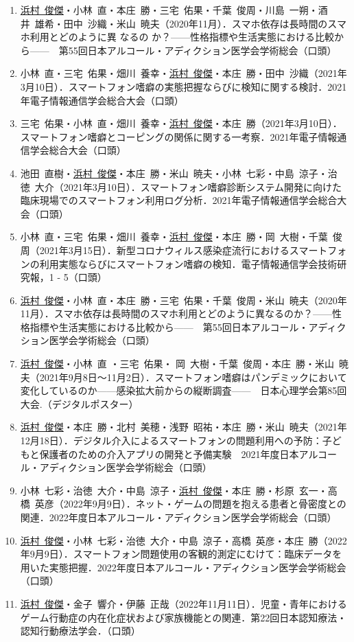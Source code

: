\documentclass{article}
\begin{document}
\begin{enumerate}
	\item \underline{浜村\ 俊傑}・小林\ 直・本庄\ 勝・三宅\ 佑果・千葉\ 俊周・川島\ 一朔・酒井\ 雄希・田中\ 沙織・米山\ 暁夫（2020年11月）．スマホ依存は長時間のスマホ利用とどのように異	なるの	か？——性格指標や生活実態における比較から——　第55回日本アルコール・アディクション医学会学術総会（口頭）
	\item 小林\ 直・三宅\ 佑果・畑川\ 養幸・\underline{浜村\ 俊傑}・本庄\ 勝・田中\ 沙織（2021年3月10日）．スマートフォン嗜癖の実態把握ならびに検知に関する検討．2021年電子情報通信学会総合大会（口頭）
	\item 三宅\ 佑果・小林\ 直・畑川\ 養幸・\underline{浜村\ 俊傑}・本庄\ 勝（2021年3月10日）．スマートフォン嗜癖とコーピングの関係に関する一考察．2021年電子情報通信学会総合大会（口頭）
	\item 池田\ 直樹・\underline{浜村\ 俊傑}・本庄\ 勝・米山\ 暁夫・小林\ 七彩・中島\ 涼子・治徳\ 大介（2021年3月10日）．スマートフォン嗜癖診断システム開発に向けた臨床現場でのスマートフォン利用ログ分析．2021年電子情報通信学会総合大会（口頭）
	\item 小林\ 直・三宅\ 佑果・畑川\ 養幸・\underline{浜村\ 俊傑}・本庄\ 勝・岡\ 大樹・千葉\ 俊周（2021年3月15日）．新型コロナウィルス感染症流行におけるスマートフォンの利用実態ならびにスマートフォン嗜癖の検知．電子情報通信学会技術研究報，1 - 5（口頭）
	\item \underline{浜村\ 俊傑}・小林\ 直・本庄\ 勝・三宅\ 佑果・千葉\ 俊周・米山\ 暁夫（2020年11月）．スマホ依存は長時間のスマホ利用とどのように異なるのか？——性格指標や生活実態における比較から——　第55回日本アルコール・アディクション医学会学術総会（口頭）
	\item \underline{浜村\ 俊傑}・小林\ 直 ・三宅\ 佑果・ 岡\ 大樹・千葉\ 俊周・本庄\ 勝・米山\ 暁夫（2021年9月8日～11月2日）．スマートフォン嗜癖はパンデミックにおいて変化しているのか——感染拡大前からの縦断調査——　日本心理学会第85回大会.（デジタルポスター）
	\item \underline{浜村\ 俊傑}・本庄\ 勝・北村\ 美穂・浅野\ 昭祐・本庄\ 勝・米山\ 暁夫（2021年12月18日）．デジタル介入によるスマートフォンの問題利用への予防：子どもと保護者のための介入アプリの開発と予備実験　2021年度日本アルコール・アディクション医学会学術総会（口頭）
	\item 小林\ 七彩・治徳\ 大介・中島\ 涼子・\underline{浜村\ 俊傑}・本庄\ 勝・杉原\ 玄一・高橋\ 英彦（2022年9月9日）．ネット・ゲームの問題を抱える患者と骨密度との関連．2022年度日本アルコール・アディクション医学会学術総会（口頭）
	\item \underline{浜村\ 俊傑}・小林\ 七彩・治徳\ 大介・中島\ 涼子・高橋\ 英彦・本庄\ 勝（2022年9月9日）．スマートフォン問題使用の客観的測定にむけて：臨床データを用いた実態把握．2022年度日本アルコール・アディクション医学会学術総会（口頭）
	\item \underline{浜村\ 俊傑}・金子\ 響介・伊藤\ 正哉（2022年11月11日）．児童・青年におけるゲーム行動症の内在化症状および家族機能との関連．第22回日本認知療法・認知行動療法学会．（口頭）
\end{enumerate}
\end{document}

